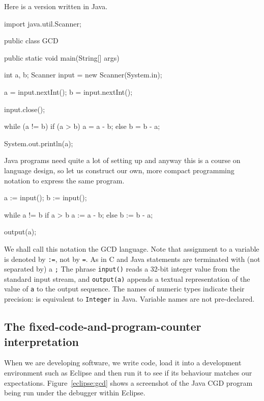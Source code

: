 \documentclass[11pt]{book}
\begin{document}
Here is a version written in Java.
\begin{codeblock}
import java.util.Scanner;

public class GCD {
  public static void main(String[] args) {
    int a, b;
    Scanner input = new Scanner(System.in);

    a = input.nextInt();
    b = input.nextInt();

    input.close();

    while (a != b)
      if (a > b)
        a = a - b;
      else
        b = b - a;

    System.out.println(a);
  }
}\end{codeblock}
Java programs need quite a lot of setting up and anyway this is a course on language design, so let us construct our own, more compact programming notation to express the same program. 
\begin{codeblock}
a := input(); 
b := input();

while a != b 
   if a > b
     a := a - b; 
   else
     b := b - a; 

output(a);
\end{codeblock}
\label{GCDCava}
We shall call this notation the GCD language. Note that assignment to a variable is denoted by \verb+:=+, not by \verb+=+. As in C and Java statements are terminated with (not separated by) a \verb+;+ The phrase \verb+input()+ reads a 32-bit integer value from the standard input stream, and \verb+output(a)+ appends a textual representation of the value of \verb+a+ to the output sequence. The names of numeric types indicate their precision: {\tt } is equivalent to {\tt Integer} in Java. Variable names are not pre-declared.
 
\subsection{The fixed-code-and-program-counter interpretation}
When we are developing software, we write code, load it into a development environment such as Eclipse and then run it to see if its behaviour matches our expectations. Figure~\ref{eclipse:gcd} shows a screenshot of the Java CGD program being run under the debugger within Eclipse. 
\end{document}
